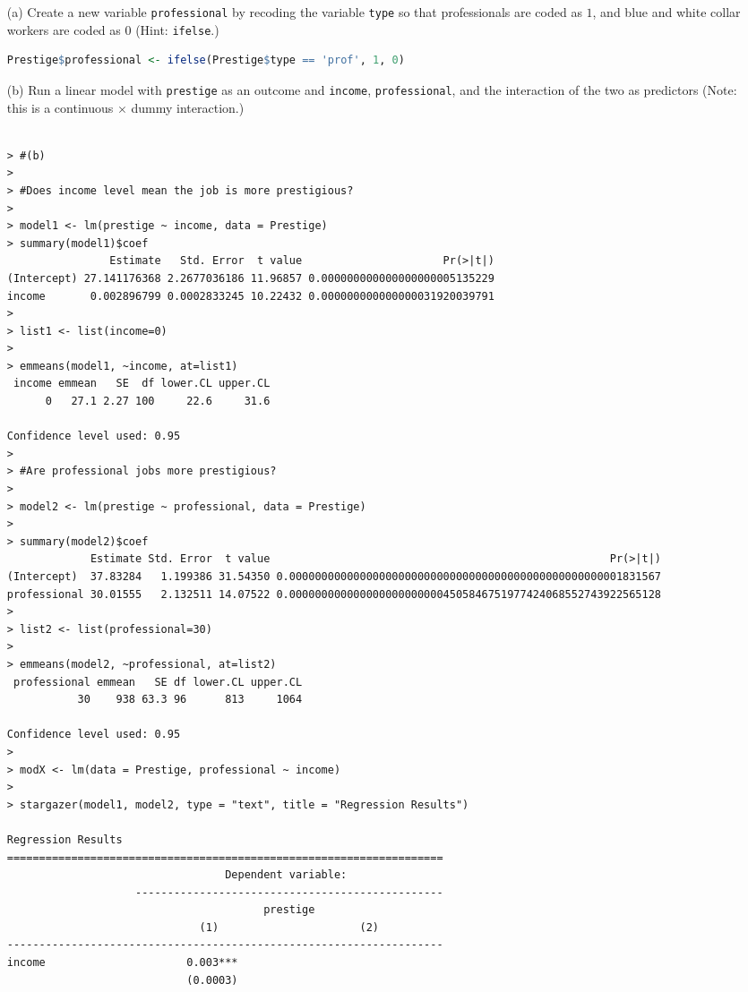 \documentclass[12pt,letterpaper]{article}
\begin{document}
\newpage
\begin{enumerate}
	
	\item [(a)]
	Create a new variable \texttt{professional} by recoding the variable \texttt{type} so that professionals are coded as $1$, and blue and white collar workers are coded as $0$ (Hint: \texttt{ifelse}.)
	
	\begin{lstlisting}[language=R]
		Prestige$professional <- ifelse(Prestige$type == 'prof', 1, 0)
	\end{lstlisting}
	
	\item [(b)]
	Run a linear model with \texttt{prestige} as an outcome and \texttt{income}, \texttt{professional}, and the interaction of the two as predictors (Note: this is a continuous $\times$ dummy interaction.)
	
	\begin{lstlisting}
	
> #(b)
> 
> #Does income level mean the job is more prestigious? 
> 
> model1 <- lm(prestige ~ income, data = Prestige)
> summary(model1)$coef
                Estimate   Std. Error  t value                      Pr(>|t|)
(Intercept) 27.141176368 2.2677036186 11.96857 0.000000000000000000005135229
income       0.002896799 0.0002833245 10.22432 0.000000000000000031920039791
> 
> list1 <- list(income=0)
> 
> emmeans(model1, ~income, at=list1)
 income emmean   SE  df lower.CL upper.CL
      0   27.1 2.27 100     22.6     31.6

Confidence level used: 0.95 
> 
> #Are professional jobs more prestigious? 
> 
> model2 <- lm(prestige ~ professional, data = Prestige)
> 
> summary(model2)$coef
             Estimate Std. Error  t value                                                     Pr(>|t|)
(Intercept)  37.83284   1.199386 31.54350 0.0000000000000000000000000000000000000000000000000001831567
professional 30.01555   2.132511 14.07522 0.0000000000000000000000004505846751977424068552743922565128
> 
> list2 <- list(professional=30)
> 
> emmeans(model2, ~professional, at=list2)
 professional emmean   SE df lower.CL upper.CL
           30    938 63.3 96      813     1064

Confidence level used: 0.95 
> 
> modX <- lm(data = Prestige, professional ~ income)
> 
> stargazer(model1, model2, type = "text", title = "Regression Results")

Regression Results
====================================================================
                                  Dependent variable:               
                    ------------------------------------------------
                                        prestige                    
                              (1)                      (2)          
--------------------------------------------------------------------
income                      0.003***                                
                            (0.0003)                                
                                                                    

\end{lstlisting}
\end{enumerate}
\end{document}
